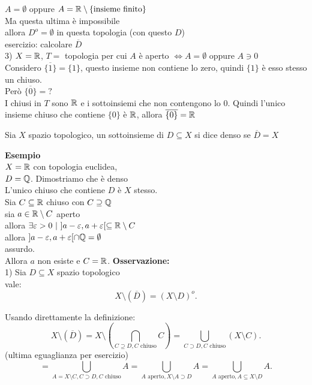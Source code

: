 \documentclass{article}
\begin{document}
	  $A = \emptyset $ oppure $A = \mathbb{R}\setminus\{\text{insieme finito}\}$\\
	  Ma questa ultima è impossibile\\
	  allora  $D^o = \emptyset$ in questa topologia (con questo $D$)\\
	  esercizio: calcolare $\overline D$\\
	  3)  $X = \mathbb{R}$, $T = $ topologia per cui $A$ è aperto $ \Leftrightarrow A = \emptyset$ oppure $A\ni 0$ \\
	  Considero $\overline{\{1\}} = \{1\}$, questo insieme non contiene lo zero, quindi $\{1\}$ è esso stesso un chiuso.\\
	  Però $\overline{\{0\}} = ?$ \\
	  I chiusi in  $T$ sono $\mathbb{R}$ e i sottoinsiemi che non contengono lo  $0$. Quindi l'unico insieme chiuso che contiene $\{0\}$ è $\mathbb{R}$, allora $\overline{\{0\}} = \mathbb{R}$
	   \begin{defi}
	  	Sia $X$ spazio topologico, un sottoinsieme di $D\subseteq X$ si dice denso se $\overline D = X$
	  \end{defi}
	  \textbf{Esempio}\\
	  $X = \mathbb{R} $ con topologia euclidea,\\
	  $D = \mathbb{Q}$. Dimostriamo che è denso\\
	  L'unico chiuso che contiene  $D$ è $X$ stesso.\\
	   Sia $C\subseteq \mathbb{R}$ chiuso con  $C\supseteq \mathbb{Q}$\\
	   sia $a\in\mathbb{R}\setminus C$ aperto\\
	   allora  $\exists \varepsilon > 0 \ | \ ]a - \varepsilon, a + \varepsilon[ \subseteq \mathbb{R}\setminus C$ \\
	   allora $] a - \varepsilon, a + \varepsilon[\cap \mathbb{Q} = \emptyset$ \\
	   assurdo.\\
	   Allora $a$ non esiste e $C = \mathbb{R}$. 
	   \textbf{Osservazione:}\\
	   1) Sia  $D\subseteq X$ spazio topologico\\
	   vale:\\
	    \[
	   X\setminus(\overline D) = (X\setminus D)^o
	   .\] 
	   \begin{dimo}
	   	Usando direttamente la definizione:\\
		\[
			X\setminus(\overline D) = X\setminus (\bigcap_{C\supseteq D, C \text { chiuso}}C) = \bigcup_{C\supset D, C \text { chiuso}}(X\setminus C) 
		.\] 
		(ultima eguaglianza per esercizio)
		\[
			= \bigcup_{A = X\setminus C, C\supset D, C\text{ chiuso}}A = \bigcup_{A\text{ aperto}, X\setminus A\supset D} A= \bigcup_{A\text{ aperto}, A\subseteq X\setminus D}A
		.\] 
	   \end{dimo}
\end{document}
